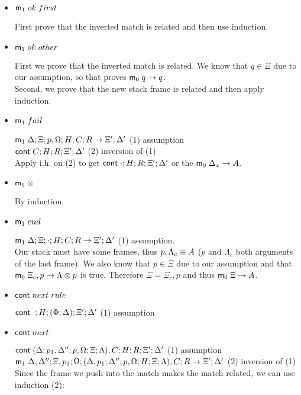 \begin{itemize}
   \item $\mathsf{m}_1 \; ok \; first$
   
   First prove that the inverted match is related and then use induction.
   
   \item $\mathsf{m}_1 \; ok \; other$
   
   First we prove that the inverted match is related. We know that $q \in \Xi$ due to our assumption, so that proves $\mathsf{m}_0 \; q \rightarrow q$. \\
   Second, we prove that the new stack frame is related and then apply induction.
   
   \item $\mathsf{m}_1 \; fail$
   
   $\mathsf{m}_1 \; \Delta; \Xi; p, \Omega; H; C; R \rightarrow \Xi'; \Delta'$ \hfill (1) assumption \\
   $\mathsf{cont} \; C; H; R; \Xi'; \Delta'$ \hfill (2) inversion of (1) \\
   Apply i.h. on (2) to get $\mathsf{cont} \; \cdot; H; R; \Xi'; \Delta'$ or the $\mathsf{m}_0 \; \Delta_x \rightarrow A$.
   
   \item $\mathsf{m}_1 \; \otimes$
   
   By induction.
   
   \item $\mathsf{m}_1 \; end$
   
   $\mathsf{m}_1 \; \Delta; \Xi; \cdot; H; C; R \rightarrow \Xi'; \Delta'$ \hfill (1) assumption.\\
   Our stack must have some frames, thus $p, \Lambda_c \equiv A$ ($p$ and $\Lambda_c$ both arguments of the last frame). We also know that $p \in \Xi$ due to our assumption and that $\mathsf{m}_0 \; \Xi_c, p \rightarrow \Lambda \otimes p$ is true. Therefore $\Xi = \Xi_c, p$ and thus $\mathsf{m}_0 \; \Xi \rightarrow A$.
   
   \item $\mathsf{cont} \; next \; rule$
   
   $\mathsf{cont} \; \cdot; H; (\Phi; \Delta); \Xi'; \Delta'$ \hfill (1) assumption \\
   
   \item $\mathsf{cont} \; next$
   
   $\mathsf{cont} \; (\Delta; p_1, \Delta''; p, \Omega; \Xi; \Lambda), C; H; R; \Xi'; \Delta'$ \hfill (1) assumption \\
   $\mathsf{m}_1 \; \Delta, \Delta''; \Xi, p_1;  \Omega; (\Delta, p_1; \Delta''; p, \Omega; H; \Xi; \Lambda), C; R \rightarrow \Xi'; \Delta'$ \hfill (2) inversion of (1)\\
   Since the frame we push into the match makes the match related, we can use induction (2):
   

\end{itemize}
